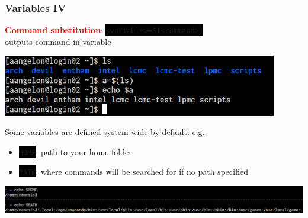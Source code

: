 \documentclass[unknownkeysallowed, 10pt, a4 paper, handout]{beamer}
\newcommand{\focus}[1]{\textbf{\textcolor{red}{#1}}}
\newcommand{\code}[1]{\colorbox{black}{\color{green}\texttt{#1}}}
\newcommand{\sidebyside}[5]{
  \begin{minipage}{#1\textwidth}
    #2
  \end{minipage} #3 \begin{minipage}{#4\textwidth}
    #5
  \end{minipage}
}
\begin{document}
\begin{frame}
  \begin{center}
    \frametitle{Variables IV}

    \sidebyside{0.40}{
      \centering
      \focus{Command substitution}:
      \code{<variable>=\$(<command>)}\\
      outputs command in variable
    }{\hfill}{0.56}{
      \begin{center}
        \includegraphics[width=0.90\textwidth]{pics/substitution.png}
      \end{center}
    }

    Some variables are defined system-wide by default: e.g.,

    \vspace{-2mm}

    \begin{itemize}
      \item \code{HOME}: path to your home folder
      \item \code{PATH}: where commands will be searched for if no path specified
    \end{itemize}

    \vspace{-3mm}

    \begin{center}
      \includegraphics[width=1.00\textwidth]{pics/environment.png}
    \end{center}


\end{center}
\end{frame}
\end{document}

